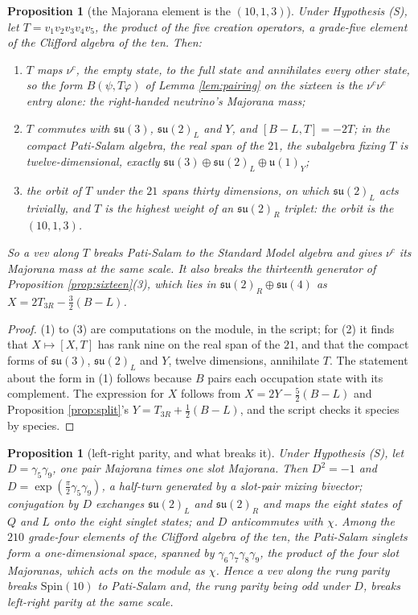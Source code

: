 \documentclass[11pt]{article}
\newtheorem{proposition}[theorem]{Proposition}
\theoremstyle{definition}
\newcommand{\su}{\mathfrak{su}}
\newcommand{\uu}{\mathfrak{u}}
\begin{document}
\begin{proposition}[the Majorana element is the $(10,1,3)$]\label{prop:breaking}
Under Hypothesis (S), let $T = v_{1}v_{2}v_{3}v_{4}v_{5}$, the product of the five creation operators, a grade-five element of the Clifford algebra of the ten. Then:
\begin{enumerate}
\item[(1)] $T$ maps $\nu^{c}$, the empty state, to the full state and annihilates every other state, so the form $B(\psi, T\varphi)$ of Lemma \ref{lem:pairing} on the sixteen is the $\nu^{c}\nu^{c}$ entry alone: the right-handed neutrino's Majorana mass;
\item[(2)] $T$ commutes with $\su(3)$, $\su(2)_{L}$ and $Y$, and $[B - L, T] = -2T$; in the compact Pati-Salam algebra, the real span of the $21$, the subalgebra fixing $T$ is twelve-dimensional, exactly $\su(3) \oplus \su(2)_{L} \oplus \uu(1)_{Y}$;
\item[(3)] the orbit of $T$ under the $21$ spans thirty dimensions, on which $\su(2)_{L}$ acts trivially, and $T$ is the highest weight of an $\su(2)_{R}$ triplet: the orbit is the $(10,1,3)$.
\end{enumerate}
So a vev along $T$ breaks Pati-Salam to the Standard Model algebra and gives $\nu^{c}$ its Majorana mass at the same scale. It also breaks the thirteenth generator of Proposition \ref{prop:sixteen}(3), which lies in $\su(2)_{R} \oplus \su(4)$ as $X = 2T_{3R} - \tfrac32(B - L)$.
\end{proposition}

\begin{proof}
(1) to (3) are computations on the module, in the script; for (2) it finds that $X \mapsto [X, T]$ has rank nine on the real span of the $21$, and that the compact forms of $\su(3)$, $\su(2)_{L}$ and $Y$, twelve dimensions, annihilate $T$. The statement about the form in (1) follows because $B$ pairs each occupation state with its complement. The expression for $X$ follows from $X = 2Y - \tfrac52(B - L)$ and Proposition \ref{prop:split}'s $Y = T_{3R} + \tfrac12(B - L)$, and the script checks it species by species.
\end{proof}

\begin{proposition}[left-right parity, and what breaks it]\label{prop:dparity}
Under Hypothesis (S), let $D = \gamma_{5}\gamma_{9}$, one pair Majorana times one slot Majorana. Then $D^{2} = -1$ and $D = \exp(\tfrac{\pi}{2}\gamma_{5}\gamma_{9})$, a half-turn generated by a slot-pair mixing bivector; conjugation by $D$ exchanges $\su(2)_{L}$ and $\su(2)_{R}$ and maps the eight states of $Q$ and $L$ onto the eight singlet states; and $D$ anticommutes with $\chi$. Among the $210$ grade-four elements of the Clifford algebra of the ten, the Pati-Salam singlets form a one-dimensional space, spanned by $\gamma_{6}\gamma_{7}\gamma_{8}\gamma_{9}$, the product of the four slot Majoranas, which acts on the module as $\chi$. Hence a vev along the rung parity breaks $\mathrm{Spin}(10)$ to Pati-Salam and, the rung parity being odd under $D$, breaks left-right parity at the same scale.
\end{proposition}
\end{document}
